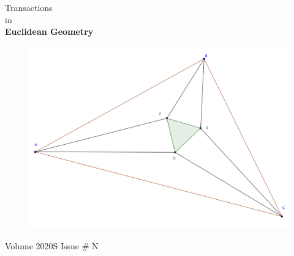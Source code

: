 \documentclass{report}
\begin{document}
\thispagestyle{empty}
\begin{center}
{\Huge Transactions\\ in\\[.2in] \textbf{Euclidean Geometry}}
\vspace{1in}

\begin{figure}[h!]
\includegraphics[width=1.1\textwidth]{cover-image.png}
\end{figure}

\vspace{1in}

{\Huge Volume 2020S Issue \# N}
\end{center}

\clearpage
\end{document}
